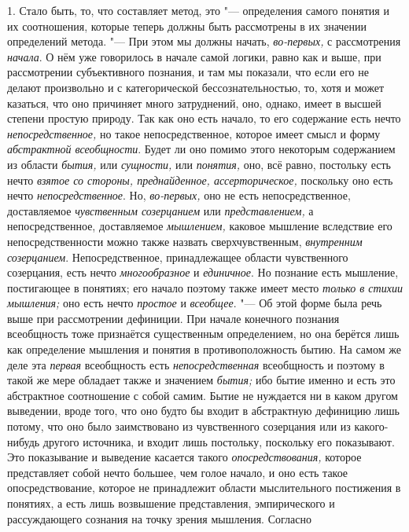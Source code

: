1. Стало быть, то, что составляет метод, это
"--- определения самого понятия и их соотношения, которые теперь
должны быть рассмотрены в их значении определений метода. "---
При этом мы должны начать, {\em во-первых,} с рассмотрения {\em начала}.
О нём уже говорилось в начале самой логики, равно как и выше,
при рассмотрении субъективного познания, и там мы показали, что если его не
делают произвольно и с категорической бессознательностью, то, хотя и может
казаться, что оно причиняет много затруднений, оно, однако,
имеет в высшей степени простую природу. Так как оно есть начало, то его
содержание есть нечто {\em непосредственное,}
но такое непосредственное, которое имеет смысл и форму
{\em абстрактной всеобщности}.
Будет ли оно помимо этого некоторым содержанием из области
{\em бытия,} или {\em сущности,} или {\em понятия,} оно, всё
равно, постольку есть нечто {\em взятое
со стороны, преднайденное, ассерторическое,} поскольку оно
есть нечто {\em непосредственное}. Но, {\em во-первых,}
оно не есть непосредственное, доставляемое
{\em чувственным созерцанием} или {\em представлением,}
а непосредственное, доставляемое {\em мышлением,} каковое
мышление вследствие его непосредственности можно также назвать
сверхчувственным, {\em внутренним
созерцанием}. Непосредственное, принадлежащее области
чувственного созерцания, есть нечто
{\em многообразное} и {\em единичное}. Но
познание есть мышление, постигающее в понятиях; его начало поэтому также
имеет место {\em только в стихии
мышления;} оно есть нечто {\em простое} и {\em всеобщее}. "--- Об этой
форме была речь выше при рассмотрении дефиниции. При начале конечного
познания всеобщность тоже признаётся существенным определением, но она
берётся лишь как определение мышления и понятия в противоположность бытию.
На самом же деле эта {\em первая} всеобщность есть {\em непосредственная}
всеобщность и поэтому в такой же мере обладает также и значением {\em бытия;}
ибо бытие именно и есть это абстрактное соотношение с собой
самим. Бытие не нуждается ни в каком другом выведении, вроде того, что оно
будто бы входит в абстрактную дефиницию лишь потому, что оно было
заимствовано из чувственного созерцания или из какого-нибудь другого
источника, и входит лишь постольку, поскольку его показывают. Это
показывание и выведение касается такого {\em опосредствования,}
которое представляет собой нечто большее, чем голое начало, и
оно есть такое опосредствование, которое не принадлежит области
мыслительного постижения в понятиях, а есть лишь возвышение представления,
эмпирического и рассуждающего сознания на точку зрения мышления. Согласно
